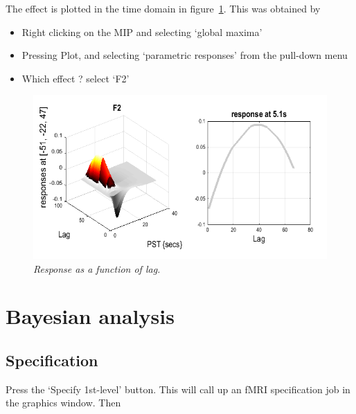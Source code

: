 \documentclass[a4paper,titlepage]{book}
\newcommand{\bi}{\begin{itemize}}
\newcommand{\ei}{\end{itemize}}
\begin{document}
The effect is plotted in the time domain in figure~\ref{famous_lag}. This was obtained by
\bi
\item{Right clicking on the MIP and selecting `global maxima'}
\item{Pressing Plot, and selecting `parametric responses' from the pull-down menu}
\item{Which effect ? select `F2'}
\ei
\begin{figure}
\begin{center}
\includegraphics[width=150mm]{famous_lag}
\caption{\em Response as a function of lag. \label{famous_lag} }
\end{center}
\end{figure}

\section{Bayesian analysis}

\subsection{Specification}

Press the `Specify 1st-level' button. This will call up an fMRI specification job in the graphics window. Then
\end{document}
